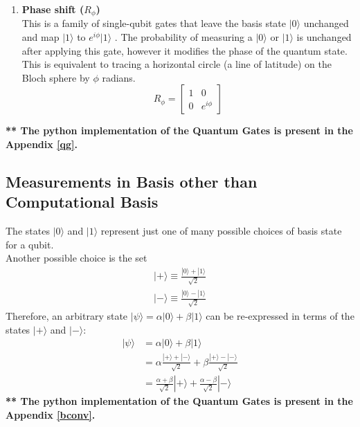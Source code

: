 \documentclass[12pt]{report}
\begin{document}
\begin{enumerate}
\item \textbf{Phase shift ($R_{\phi }$)}\\
This is a family of single-qubit gates that leave the basis state $|0\rangle$  unchanged and map $|1\rangle$  to $e^{{i\phi }}|1\rangle$ . The probability of measuring a $|0\rangle$  or $|1\rangle$  is unchanged after applying this gate, however it modifies the phase of the quantum state. This is equivalent to tracing a horizontal circle (a line of latitude) on the Bloch sphere by $\phi$  radians.
\begin{equation*}
R_{\phi }=\begin{bmatrix}1&0\\0&e^{i\phi }\end{bmatrix}
\end{equation*}
\end{enumerate}
\textbf{** The python implementation of the Quantum Gates is present in the Appendix \ref{qg}.}
\newline
\subsection{Measurements in Basis other than Computational Basis}
The states $|0\rangle$ and $|1\rangle$ represent just one of many possible choices of basis state for a qubit.\\
Another possible choice is the set \begin{equation}
\begin{split}
|+\rangle \equiv \frac{|0\rangle + |1\rangle}{\sqrt{2}} \\
|-\rangle \equiv  \frac{|0\rangle - |1\rangle}{\sqrt{2}} 
\end{split}
\end{equation}
Therefore, an arbitrary state $|\psi\rangle = \alpha|0\rangle+\beta|1\rangle$ can be re-expressed in terms of the states $|+\rangle$ and $|-\rangle$:
\begin{equation}
\begin{split}
|\psi\rangle &= \alpha|0\rangle+\beta|1\rangle \\
& = \alpha\frac{|+\rangle + |-\rangle }{\sqrt{2}} + \beta\frac{|+\rangle - |-\rangle }{\sqrt{2}} \\
&= \frac{\alpha + \beta}{\sqrt{2}} |+\rangle + \frac{\alpha - \beta}{\sqrt{2}} |-\rangle
\end{split}
\end{equation}
\textbf{** The python implementation of the Quantum Gates is present in the Appendix \ref{bconv}.}
\end{document}
